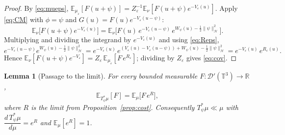 \documentclass[12pt]{article}
\newtheorem{lemma}{Lemma}
\theoremstyle{definition}
\newcommand{\T}{\mathbb{T}^3}
\newcommand{\R}{\mathbb{R}}
\newcommand{\E}{\mathbb{E}}
\newcommand{\D}{\mathcal{D}'(\T)}
\begin{document}
\begin{proof}
By \eqref{eq:mueps},
$\E_{\mu_\varepsilon}[F(u+\psi)]=Z_\varepsilon^{-1}\E_\nu[F(u+\psi)e^{-V_\varepsilon(u)}]$.
Apply \eqref{eq:CM} with $\phi=\psi$ and $G(u)=F(u)e^{-V_\varepsilon(u-\psi)}$:
\[
  \E_\nu\!\big[F(u+\psi)e^{-V_\varepsilon(u)}\big]
  =\E_\nu\!\Big[F(u)\,e^{-V_\varepsilon(u-\psi)}\,e^{W_\psi(u)-\frac12\|\psi\|_{\mathcal H}^2}\Big].
\]
Multiplying and dividing the integrand by $e^{-V_\varepsilon(u)}$ and using
\eqref{eq:Reps},
\[
  e^{-V_\varepsilon(u-\psi)}e^{W_\psi(u)-\frac12\|\psi\|_{\mathcal H}^2}
  =e^{-V_\varepsilon(u)}\,e^{(V_\varepsilon(u)-V_\varepsilon(u-\psi))+W_\psi(u)-\frac12\|\psi\|_{\mathcal H}^2}
  =e^{-V_\varepsilon(u)}\,e^{R_\varepsilon(u)} .
\]
Hence $\E_\nu[F(u+\psi)e^{-V_\varepsilon}]=Z_\varepsilon\,\E_{\mu_\varepsilon}[F\,e^{R_\varepsilon}]$;
dividing by $Z_\varepsilon$ gives \eqref{eq:cov}.
\end{proof}

\begin{lemma}[Passage to the limit]\label{lem:limit}
For every bounded measurable $F\colon\D\to\R$,
\begin{equation}\label{eq:limit}
  \E_{T_\psi^{*}\mu}\![F]=\E_\mu\!\big[F\,e^{R}\big],
\end{equation}
where $R$ is the limit from Proposition~\ref{prop:cost}. Consequently
$T_\psi^{*}\mu\ll\mu$ with $\dfrac{d\,T_\psi^{*}\mu}{d\mu}=e^{R}$ and $\E_\mu[e^R]=1$.
\end{lemma}
\end{document}
